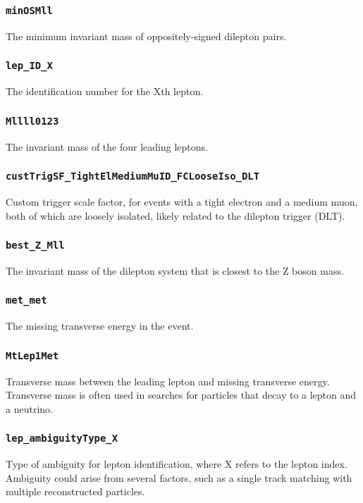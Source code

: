 \subsubsection{\texttt{minOSMll}} The minimum invariant mass of oppositely-signed dilepton pairs.

\subsubsection{\texttt{lep\_ID\_X}} The identification number for the Xth lepton.

\subsubsection{\texttt{Mllll0123}} The invariant mass of the four leading leptons.

\subsubsection{\texttt{custTrigSF\_TightElMediumMuID\_FCLooseIso\_DLT}} Custom trigger scale factor, for events with a
tight electron and a medium muon, both of which are loosely isolated, likely related to the dilepton trigger (DLT).

\subsubsection{\texttt{best\_Z\_Mll}} The invariant mass of the dilepton system that is closest to the Z boson mass.

\subsubsection{\texttt{met\_met}} The missing transverse energy in the event.

\subsubsection{\texttt{MtLep1Met}} Transverse mass between the leading lepton and missing transverse energy. Transverse
mass is often used in searches for particles that decay to a lepton and a neutrino.

\subsubsection{\texttt{lep\_ambiguityType\_X}} Type of ambiguity for lepton identification, where X refers to the lepton
index. Ambiguity could arise from several factors, such as a single track matching with multiple reconstructed
particles.

